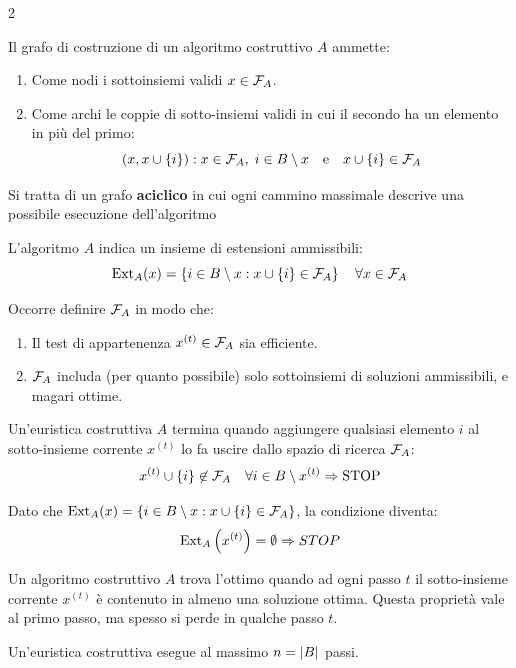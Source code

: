 \documentclass[\main/main.tex]{subfiles}
\begin{document}
\begin{multicols}{2}
\begin{definition}
\begin{enumerate}
    \end{enumerate}
\end{definition}
\begin{definition}
Il grafo di costruzione di un algoritmo costruttivo \(A\) ammette:
\begin{enumerate}
    \item Come nodi i sottoinsiemi validi \(x \in \mathcal{F}_A\).
    \item Come archi le coppie di sotto-insiemi validi in cui il secondo ha un elemento in più del primo:
    \[
        \left(x, x \cup \left\{i\right\}\right): x \in \mathcal{F}_A, \; i \in B \setminus x \quad \text{e} \quad x \cup \left\{i\right\} \in \mathcal{F}_A
    \]
\end{enumerate}

Si tratta di un grafo \textbf{aciclico} in cui ogni cammino massimale descrive una possibile esecuzione dell'algoritmo
\end{definition}
\begin{observation}
    L'algoritmo \(A\) indica un insieme di estensioni ammissibili:
    \[
        \text{Ext}_A(x) = \left\{i \in B \setminus x: x \cup \left\{i\right\} \in \mathcal{F}_A\right\} \quad \forall x \in \mathcal{F}_A 
    \]
\end{observation}
\begin{definition}
    Occorre definire \(\mathcal{F}_A\) in modo che:
    \begin{enumerate}
        \item Il test di appartenenza \(x^{(t)} \in \mathcal{F}_A\) sia efficiente.
        \item \(\mathcal{F}_A\) includa (per quanto possibile) solo sottoinsiemi di soluzioni ammissibili, e magari ottime.
    \end{enumerate}
\end{definition}
\begin{observation}
    Un'euristica costruttiva \(A\) termina quando aggiungere qualsiasi elemento \(i\) al sotto-insieme corrente \(x^{(t)}\) lo fa uscire dallo spazio di ricerca \(\mathcal{F}_A\):
    \[
        x^{(t)} \cup \left\{i\right\} \not\in \mathcal{F}_A \quad \forall i \in B \setminus x^{(t)} \Rightarrow \text{STOP}
    \]
    
    Dato che \(\text{Ext}_A(x) = \left\{i \in B\setminus x: x \cup \left\{i\right\} \in \mathcal{F}_A\right\}\), la condizione diventa:
    \[
        \text{Ext}_A\left(x^{(t)}\right) = \emptyset \Rightarrow STOP
    \]
\end{observation}
\begin{observation}
    Un algoritmo costruttivo \(A\) trova l'ottimo quando ad ogni passo \(t\) il sotto-insieme corrente \(x^{(t)}\) è contenuto in almeno una soluzione ottima. Questa proprietà vale al primo passo, ma spesso si perde in qualche passo \(t\).
\end{observation}
\begin{observation}
    Un'euristica costruttiva esegue al massimo \(n = \left\lvert B\right\rvert\) passi.
\end{observation}
\end{multicols}
\end{document}
